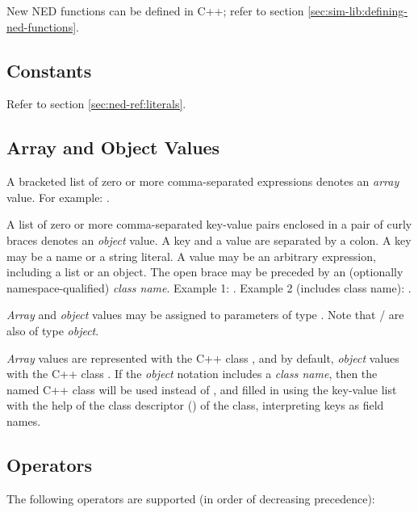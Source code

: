 \begin{note}
New NED functions can be defined in C++; refer to section \ref{sec:sim-lib:defining-ned-functions}.
\end{note}

\subsection{Constants}
\label{sec:ned-ref:constants}

Refer to section \ref{sec:ned-ref:literals}.

\subsection{Array and Object Values}
\label{sec:ned-ref:arrays-and-objects}

A bracketed list of zero or more comma-separated expressions denotes an
\textit{array} value. For example: .

A list of zero or more comma-separated key-value pairs enclosed in a pair of curly braces
denotes an \textit{object} value. A key and a value are separated by a colon. A key may be
a name or a string literal. A value may be an arbitrary expression, including a
list or an object. The open brace may be preceded by an (optionally namespace-qualified)
\textit{class name}.
Example 1: .
Example 2 (includes class name): .

\textit{Array} and \textit{object} values may be assigned to parameters of type .
Note that  /  are also of type \textit{object}.

\textit{Array} values are represented with the C++ class ,
and by default, \textit{object} values with the C++ class .
If the \textit{object} notation includes a \textit{class name}, then the named C++ class
will be used instead of , and filled in using the key-value list
with the help of the class descriptor () of the class,
interpreting keys as field names.


\subsection{Operators}
\label{sec:ned-ref:operators}

The following operators are supported (in order of decreasing precedence):

